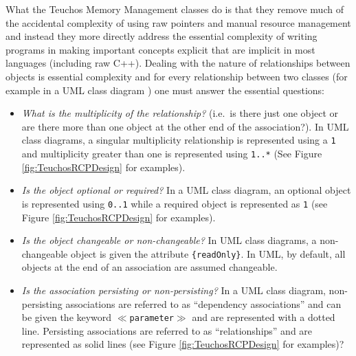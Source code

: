 \documentclass[pdf,ps2pdf,11pt]{SANDreport}
\begin{document}
What the Teuchos Memory Management classes do is that they remove much
of the accidental complexity of using raw pointers and manual resource
management and instead they more directly address the essential
complexity of writing programs in making important concepts explicit
that are implicit in most languages (including raw C++).  Dealing with
the nature of relationships between objects is essential complexity
and for every relationship between two classes (for example in a UML
class diagram {}\cite{UMLDistilledThirdEdition04}) one must answer the
essential questions:

\begin{itemize}

{}\item\textit{What is the multiplicity of the relationship?}  (i.e.\
is there just one object or are there more than one object at the
other end of the association?).  In UML class diagrams, a singular
multiplicity relationship is represented using a {}\texttt{1} and
multiplicity greater than one is represented using {}\texttt{1..*}
(See Figure {}\ref{fig:TeuchosRCPDesign} for examples).

{}\item\textit{Is the object optional or required?}  In a UML class
diagram, an optional object is represented using {}\texttt{0..1} while
a required object is represented as {}\texttt{1} (see Figure
{}\ref{fig:TeuchosRCPDesign} for examples).

{}\item\textit{Is the object changeable or non-changeable?}  In UML
class diagrams, a non-changeable object is given the attribute
{}\texttt{\{readOnly\}}.  In UML, by default, all objects at the end
of an association are assumed changeable.

{}\item\textit{Is the association persisting or non-persisting?}  In a
UML class diagram, non-persisting associations are referred to as
``dependency associations'' and can be given the keyword
{}\texttt{$\ll$parameter$\gg$} and are represented with a dotted line.
Persisting associations are referred to as ``relationships'' and are
represented as solid lines (see Figure {}\ref{fig:TeuchosRCPDesign}
for examples)?

\end{itemize}
\end{document}
